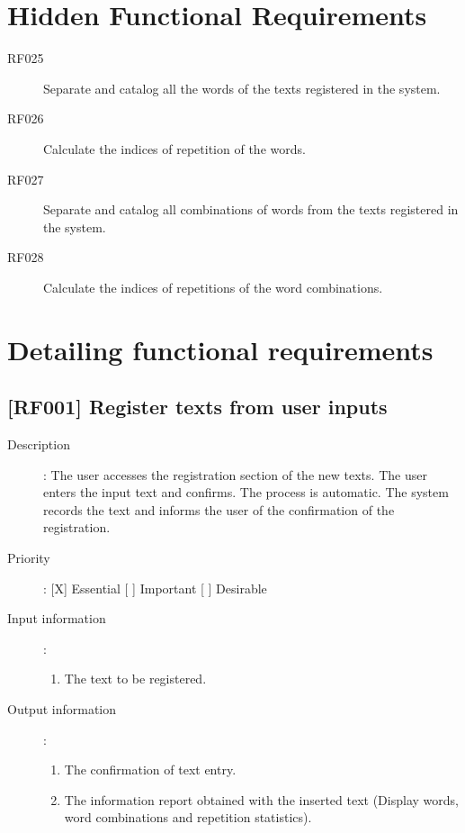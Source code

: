\documentclass[11pt, twoside, a4paper]{book}
\begin{document}
		\section{Hidden Functional Requirements}
			
			\begin{description}

				\item[RF025] Separate and catalog all the words of the texts registered in the system.
				\item[RF026] Calculate the indices of repetition of the words.
				\item[RF027] Separate and catalog all combinations of words from the texts registered in the system.
				\item[RF028] Calculate the indices of repetitions of the word combinations.

			\end{description}
			
		\section{Detailing functional requirements}
			
			\subsection{[RF001] Register texts from user inputs}
				
				\begin{description}
				
					\item[Description]: The user accesses the registration section of the new texts. The user enters the input text and confirms. The process is automatic. The system records the text and informs the user of the confirmation of the registration.	
					\item[Priority]: [X] Essential [ ] Important [ ] Desirable
					\item[Input information]:
						\begin{enumerate}
						
							\item The text to be registered.
							
						\end{enumerate}
					\item[Output information]:
						\begin{enumerate}
						
							\item The confirmation of text entry.
							\item The information report obtained with the inserted text (Display words, word combinations and repetition statistics).
														
						\end{enumerate}
	
				\end{description}
\end{document}
